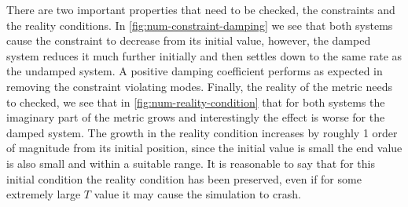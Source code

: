 \documentclass[10pt]{report}
\theoremstyle{definition}
\begin{document}
    There are two important properties that need to be checked, the constraints and the reality conditions. In \cref{fig:num-constraint-damping} we see that both systems cause the constraint to decrease from its initial value, however, the damped system reduces it much further initially and then settles down to the same rate as the undamped system. A positive damping coefficient performs as expected in removing the constraint violating modes. Finally, the reality of the metric needs to checked, we see that in \cref{fig:num-reality-condition} that for both systems the imaginary part of the metric grows and interestingly the effect is worse for the damped system. The growth in the reality condition increases by roughly 1 order of magnitude from its initial position, since the initial value is small the end value is also small and within a suitable range. It is reasonable to say that for this initial condition the reality condition has been preserved, even if for some extremely large $T$ value it may cause the simulation to crash.
\end{document}

